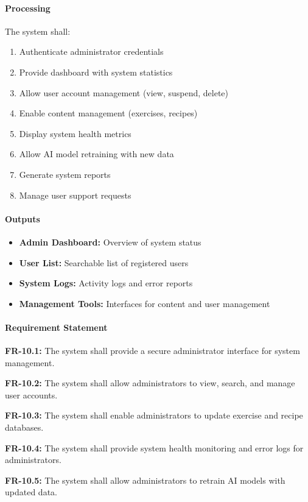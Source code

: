 \documentclass[12pt,a4paper]{article}
\begin{document}
\paragraph{Processing}
The system shall:
\begin{enumerate}
    \item Authenticate administrator credentials
    \item Provide dashboard with system statistics
    \item Allow user account management (view, suspend, delete)
    \item Enable content management (exercises, recipes)
    \item Display system health metrics
    \item Allow AI model retraining with new data
    \item Generate system reports
    \item Manage user support requests
\end{enumerate}

\paragraph{Outputs}
\begin{itemize}
    \item \textbf{Admin Dashboard:} Overview of system status
    \item \textbf{User List:} Searchable list of registered users
    \item \textbf{System Logs:} Activity logs and error reports
    \item \textbf{Management Tools:} Interfaces for content and user management
\end{itemize}

\paragraph{Requirement Statement}
\textbf{FR-10.1:} The system shall provide a secure administrator interface for system management.

\textbf{FR-10.2:} The system shall allow administrators to view, search, and manage user accounts.

\textbf{FR-10.3:} The system shall enable administrators to update exercise and recipe databases.

\textbf{FR-10.4:} The system shall provide system health monitoring and error logs for administrators.

\textbf{FR-10.5:} The system shall allow administrators to retrain AI models with updated data.
\end{document}
